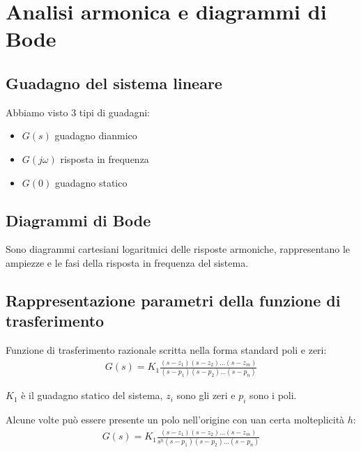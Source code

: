 \chapter{Analisi armonica e diagrammi di Bode}



\section{Guadagno del sistema lineare}

Abbiamo visto 3 tipi di guadagni:
\begin{itemize}
  \item $G(s)$ guadagno dianmico
  \item $G(j\omega)$ risposta in frequenza
  \item $G(0)$ guadagno statico
\end{itemize}


\section{Diagrammi di Bode}
Sono diagrammi cartesiani logaritmici delle risposte armoniche, rappresentano le ampiezze e 
le fasi della risposta in frequenza del sistema. 


\section{Rappresentazione parametri della funzione di trasferimento}

Funzione di trasferimento razionale scritta nella forma standard poli e zeri:
\begin{align}
  G(s) = K_1 \frac{(s-z_1)(s-z_2)\dots(s-z_m)}{(s-p_1)(s-p_2)\dots(s-p_n)}
\end{align}

$K_1$ è il guadagno statico del sistema, $z_i$ sono gli zeri e $p_i$ sono i poli. 

Alcune volte può essere presente un polo nell'origine con uan certa molteplicità $h$:
\begin{align}
  G(s) = K_1 \frac{(s-z_1)(s-z_2)\dots(s-z_m)}{s^h(s-p_1)(s-p_2)\dots(s-p_n)}
\end{align}


